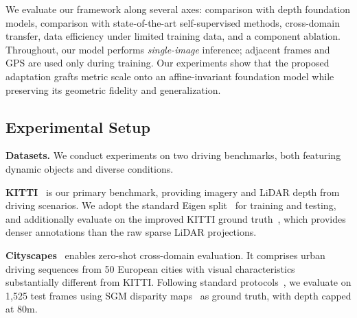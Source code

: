 



We evaluate our framework along several axes: comparison with depth foundation models, comparison with state-of-the-art self-supervised methods, cross-domain transfer, data efficiency under limited training data, and a component ablation. Throughout, our model performs \emph{single-image} inference; adjacent frames and GPS are used only during training. Our experiments show that the proposed adaptation grafts metric scale onto an affine-invariant foundation model while preserving its geometric fidelity and generalization.

\subsection{Experimental Setup}

\textbf{Datasets.} We conduct experiments on two driving benchmarks, both featuring dynamic objects and diverse conditions.
\bigbreak

\textbf{KITTI}~\cite{geiger2013vision} is our primary benchmark, providing imagery and LiDAR depth from driving scenarios. We adopt the standard Eigen split~\cite{eigen2015predicting} for training and testing, and additionally evaluate on the improved KITTI ground truth~\cite{uhrig2017sparsity}, which provides denser annotations than the raw sparse LiDAR projections.

\textbf{Cityscapes}~\cite{cordts2016cityscapes} enables zero-shot cross-domain evaluation. It comprises urban driving sequences from 50 European cities with visual characteristics substantially different from KITTI. Following standard protocols~\cite{zhou2017unsupervised, gordon2019depth}, we evaluate on 1,525 test frames using SGM disparity maps~\cite{hirschmuller2007stereo} as ground truth, with depth capped at 80m.
\bigbreak

